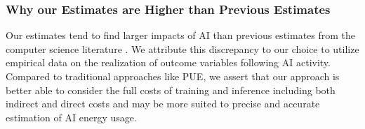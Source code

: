 \documentclass[sigconf,authordraft]{acmart}
\newcommand{\nb}[1]{\textcolor{blue}{NB[#1]}}
\begin{document}
\subsubsection{Why our Estimates are Higher than Previous Estimates}
Our estimates tend to find larger impacts of AI than previous estimates from the computer science literature \cite{strubell19, schwartz2020green}. We attribute this discrepancy to our choice to utilize empirical data on the realization of outcome variables following AI activity. Compared to traditional approaches like PUE, we assert that our approach is better able to consider the full costs of training and inference including both indirect and direct costs and may be more suited to precise and accurate estimation of AI energy usage.





\end{document}

